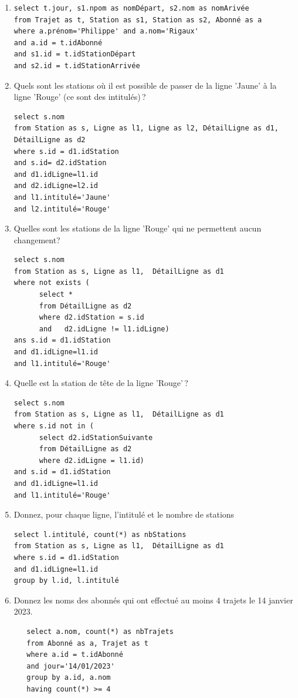    
\begin{solution}
\begin{enumerate}

 \item 
\begin{verbatim}
select t.jour, s1.npom as nomDépart, s2.nom as nomArivée 
from Trajet as t, Station as s1, Station as s2, Abonné as a
where a.prénom='Philippe' and a.nom='Rigaux'
and a.id = t.idAbonné
and s1.id = t.idStationDépart
and s2.id = t.idStationArrivée
\end{verbatim}     

  \item Quels sont les stations où il est possible de passer de la ligne 'Jaune'  à la ligne 'Rouge'
     (ce sont des intitulés)\,?
\begin{verbatim}
select s.nom
from Station as s, Ligne as l1, Ligne as l2, DétailLigne as d1, DétailLigne as d2
where s.id = d1.idStation
and s.id= d2.idStation
and d1.idLigne=l1.id
and d2.idLigne=l2.id
and l1.intitulé='Jaune'
and l2.intitulé='Rouge'
\end{verbatim}    

  \item Quelles sont les stations de la ligne 'Rouge' qui ne permettent aucun changement?
\begin{verbatim}
select s.nom
from Station as s, Ligne as l1,  DétailLigne as d1
where not exists (
      select * 
      from DétailLigne as d2
      where d2.idStation = s.id
      and   d2.idLigne != l1.idLigne)
ans s.id = d1.idStation
and d1.idLigne=l1.id
and l1.intitulé='Rouge'
\end{verbatim} 
   \item Quelle est la station de tête de la ligne 'Rouge'\,?
\begin{verbatim}
select s.nom
from Station as s, Ligne as l1,  DétailLigne as d1
where s.id not in (
      select d2.idStationSuivante
      from DétailLigne as d2
      where d2.idLigne = l1.id)
and s.id = d1.idStation
and d1.idLigne=l1.id
and l1.intitulé='Rouge'
\end{verbatim} 
   \item Donnez, pour chaque ligne, l'intitulé et le nombre de stations
\begin{verbatim}
select l.intitulé, count(*) as nbStations
from Station as s, Ligne as l1,  DétailLigne as d1
where s.id = d1.idStation
and d1.idLigne=l1.id
group by l.id, l.intitulé
\end{verbatim} 
   \item Donnez les noms des abonnés qui  ont effectué au moins 4 trajets le 14 janvier 2023.

\begin{verbatim}
   select a.nom, count(*) as nbTrajets
   from Abonné as a, Trajet as t
   where a.id = t.idAbonné
   and jour='14/01/2023'
   group by a.id, a.nom
   having count(*) >= 4
\end{verbatim}
   
\end{enumerate}


\end{solution}
